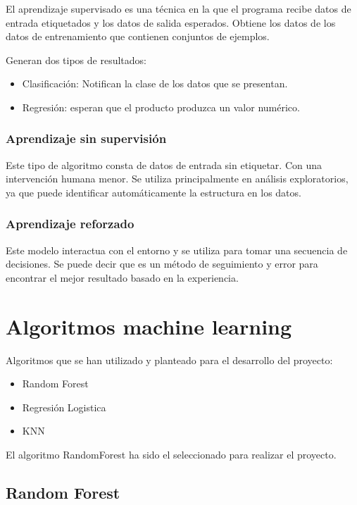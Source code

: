 El aprendizaje supervisado es una técnica en la que el programa recibe datos de entrada etiquetados y los datos de salida esperados. Obtiene los datos de los datos de entrenamiento que contienen conjuntos de ejemplos. 

Generan dos tipos de resultados:
\begin{itemize}
\item Clasificación: Notifican la clase de los datos que se presentan.
\item Regresión: esperan que el producto produzca un valor numérico.
\end{itemize}
 
\subsubsection{Aprendizaje sin supervisión}

Este tipo de algoritmo consta de datos de entrada sin etiquetar. Con una intervención humana menor. Se utiliza principalmente en análisis exploratorios, ya que puede identificar automáticamente la estructura en los datos.

\subsubsection{Aprendizaje reforzado}

Este modelo interactua con el entorno y se utiliza para tomar una secuencia de decisiones. Se puede decir que es un método de seguimiento y error para encontrar el mejor resultado basado en la experiencia.

\section{Algoritmos machine learning}

Algoritmos que se han utilizado y planteado para el desarrollo del proyecto:

\begin{itemize}
\item Random Forest
\item Regresión Logistica
\item KNN
\end{itemize}

El algoritmo RandomForest ha sido el seleccionado para realizar el proyecto.

\subsection{Random Forest}

